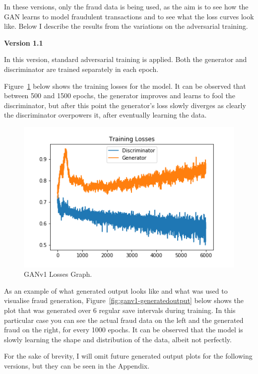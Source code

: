 \documentclass[12pt,a4paper,twoside]{report}
\begin{document}
In these versions, only the fraud data is being used, as the aim is to see how the GAN learns to model fraudulent transactions and to see what the loss curves look like. Below I describe the results from the variations on the adversarial training. 

\textbf{Version 1.1}

In this version, standard adversarial training is applied. Both the generator and discriminator are trained separately in each epoch.

Figure~\ref{fig:ganv1-losses} below shows the training losses for the model. It can be observed that between 500 and 1500 epochs, the generator improves and learns to fool the discriminator, but after this point the generator's loss slowly diverges as clearly the discriminator overpowers it, after eventually learning the data.

\begin{figure}[!htbp]
\centering
\includegraphics[scale=0.6]{GANv1-losses}
\caption{GANv1 Losses Graph.}
\label{fig:ganv1-losses}
\end{figure}

As an example of what generated output looks like and what was used to visualise fraud generation, Figure~\ref{fig:ganv1-generatedoutput} below shows the plot that was generated over 6 regular save intervals during training. In this particular case you can see the actual fraud data on the left and the generated fraud on the right, for every 1000 epochs. It can be observed that the model is slowly learning the shape and distribution of the data, albeit not perfectly. 

For the sake of brevity, I will omit future generated output plots for the following versions, but they can be seen in the Appendix. 
\end{document}
